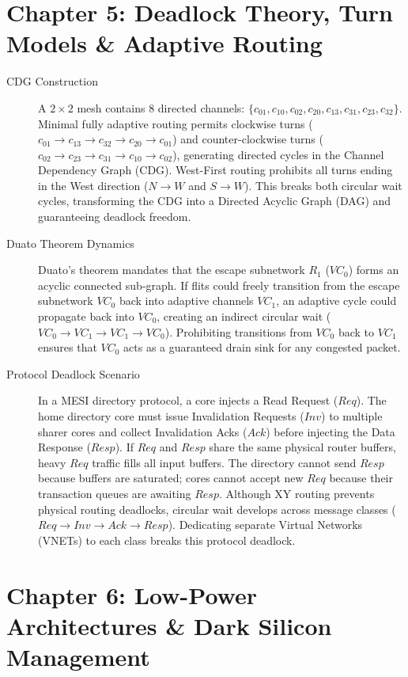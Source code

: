 \section*{Chapter 5: Deadlock Theory, Turn Models \& Adaptive Routing}

\begin{description}
    \item[CDG Construction] A $2 \times 2$ mesh contains 8 directed channels: $\{c_{01}, c_{10}, c_{02}, c_{20}, c_{13}, c_{31}, c_{23}, c_{32}\}$. Minimal fully adaptive routing permits clockwise turns ($c_{01} \to c_{13} \to c_{32} \to c_{20} \to c_{01}$) and counter-clockwise turns ($c_{02} \to c_{23} \to c_{31} \to c_{10} \to c_{02}$), generating directed cycles in the Channel Dependency Graph (CDG). West-First routing prohibits all turns ending in the West direction ($N \to W$ and $S \to W$). This breaks both circular wait cycles, transforming the CDG into a Directed Acyclic Graph (DAG) and guaranteeing deadlock freedom.

    \item[Duato Theorem Dynamics] Duato's theorem mandates that the escape subnetwork $R_1$ ($VC_0$) forms an acyclic connected sub-graph. If flits could freely transition from the escape subnetwork $VC_0$ back into adaptive channels $VC_1$, an adaptive cycle could propagate back into $VC_0$, creating an indirect circular wait ($VC_0 \to VC_1 \to VC_1 \to VC_0$). Prohibiting transitions from $VC_0$ back to $VC_1$ ensures that $VC_0$ acts as a guaranteed drain sink for any congested packet.

    \item[Protocol Deadlock Scenario] In a MESI directory protocol, a core injects a Read Request ($Req$). The home directory core must issue Invalidation Requests ($Inv$) to multiple sharer cores and collect Invalidation Acks ($Ack$) before injecting the Data Response ($Resp$). If $Req$ and $Resp$ share the same physical router buffers, heavy $Req$ traffic fills all input buffers. The directory cannot send $Resp$ because buffers are saturated; cores cannot accept new $Req$ because their transaction queues are awaiting $Resp$. Although XY routing prevents physical routing deadlocks, circular wait develops across message classes ($Req \to Inv \to Ack \to Resp$). Dedicating separate Virtual Networks (VNETs) to each class breaks this protocol deadlock.
\end{description}

\section*{Chapter 6: Low-Power Architectures \& Dark Silicon Management}

